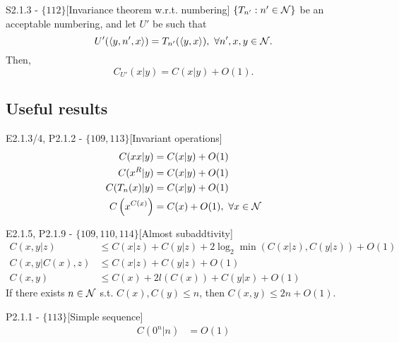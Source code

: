 \documentclass{article}
\begin{document}
\begin{flexitheorem}{S2.1.3 - $\{112\}$}[Invariance theorem w.r.t. numbering]
    $\{T_{n'}:  n' \in \mathcal{N}\}$ be an acceptable numbering, and let $U'$ be such that
    \begin{equation}
        U'(\langle y, n', x \rangle) = T_{n'}(\langle y, x \rangle), \ \forall n',x,y \in \mathcal{N}. 
    \end{equation}
    Then,
    \begin{equation}
        C_{U'}(x|y) = C(x|y) + O(1).
    \end{equation}
\end{flexitheorem}

\subsection{Useful results}
\begin{flexilemma}{E2.1.3/4, P2.1.2 - $\{109,113\}$}[Invariant operations]
    \begin{align}
        C(xx|y) &= C(x|y) + O(1)\\
        C(x^R|y) &= C(x|y) + O(1)\\
        C(T_n(x)|y) &= C(x|y) + O(1)\\
        C\left(x^{C(x)}\right) &= C(x) + O(1), \ \forall x \in \mathcal{N}
    \end{align}
\end{flexilemma}

\begin{flexilemma}{E2.1.5, P2.1.9 - $\{109,110,114\}$}[Almost subaddtivity]
    \begin{align}
        C(x,y|z) &\leq C(x|z) + C(y|z) + 2\log_2\min (C(x|z), C(y|z)) + O(1)\\
        C(x,y|C(x),z) &\leq C(x|z) + C(y|z) + O(1)\\
        C(x,y) &\leq C(x) + 2l(C(x)) + C(y|x) + O(1)
    \end{align}
    If there exists $n \in \mathcal{N}$ s.t. $C(x),C(y) \leq n$, then $C(x,y) \leq 2n + O(1)$.
\end{flexilemma}

\begin{flexilemma}{P2.1.1 - $\{113\}$}[Simple sequence]
    \begin{align}
        C(0^n|n) &= O(1)
    \end{align}
\end{flexilemma}
\end{document}
